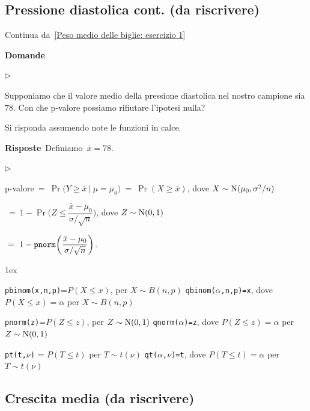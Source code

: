 \documentclass[11pt,openany]{book}
\newcommand{\mylabel}[1]{{\footnotesize\textsf{#1}}\hfill}
\renewenvironment{itemize}
  {\begin{list}{$\triangleright$}{%
   \setlength{\parskip}{0mm}
   \setlength{\topsep}{.2\baselineskip}
   \setlength{\rightmargin}{0mm}
   \setlength{\listparindent}{0mm}
   \setlength{\itemindent}{0mm}
   \setlength{\labelwidth}{3ex}
   \setlength{\itemsep}{.4\baselineskip}
   \setlength{\parsep}{0mm}
   \setlength{\partopsep}{0mm}
   \setlength{\labelsep}{1ex}
   \setlength{\leftmargin}{\labelwidth+\labelsep}
   \let\makelabel\mylabel}}{%
   \end{list}\vspace*{-1.3mm}}
\begin{document}
\clearpage\subsection{Pressione diastolica cont. (da riscrivere)}
\label{Pressione diastolica esercizio 2}

Continua da~\ref{Peso medio delle biglie: esercizio 1}

\textbf{Domande}

\begin{itemize}
\item[6.] Supponiamo che il valore medio della pressione diastolica nel nostro campione sia $78$. 
Con che p-valore possiamo rifiutare l'ipotesi nulla?
\end{itemize}
Si risponda assumendo note le funzioni in calce.

\textbf{Risposte}\  Definiamo\ $\bar x=78$.\medskip

\begin{itemize}
\item[6.] 

p-valore$\ =\ \Pr\big(Y\ge \bar x\ \mathbin\big|\ \mu=\mu_0\big)\ =\ \Pr(X\ge\bar x)$, dove $X\sim {\rm N}(\mu_0,\sigma^2/n)$\medskip\smallskip

\phantom{p-valore}$\ =\ 1-\Pr\bigg(Z\le \dfrac{\bar x-\mu_0}{\sigma/\sqrt n}\bigg)$, dove $Z\sim {\rm N}(0,1)$\medskip

\phantom{p-valore}$\ =\ 1- {\tt pnorm}\bigg(\dfrac{\bar x-\mu_0}{\sigma/\sqrt n}\bigg)$.

\end{itemize}

\vfill
\parskip1ex
{\hrulefill\scriptsize

{\tt pbinom(x,n,p)}=$P(X\le x)$, per $X\sim B(n,p)$
\hfill 
{\tt qbinom($\alpha$,n,p)=x},  dove $P(X\le x)=\alpha$ per $X\sim B(n,p)$

{\tt pnorm(z)}=$P(Z\le z)$, per $Z\sim {\rm N}(0,1)$
\hfill 
{\tt qnorm($\alpha$)=z},  dove $P(Z\le z)=\alpha$ per $Z\sim {\rm N}(0,1)$

{\tt pt(t,$\nu$)} = $P(T\le t)$ per $T\sim t(\nu)$
\hfill
{\tt qt($\alpha$,$\nu$)=t}, dove $P(T\le t)=\alpha$ per $T\sim t(\nu)$

}

\clearpage\subsection{Crescita media (da riscrivere)}
\end{document}
